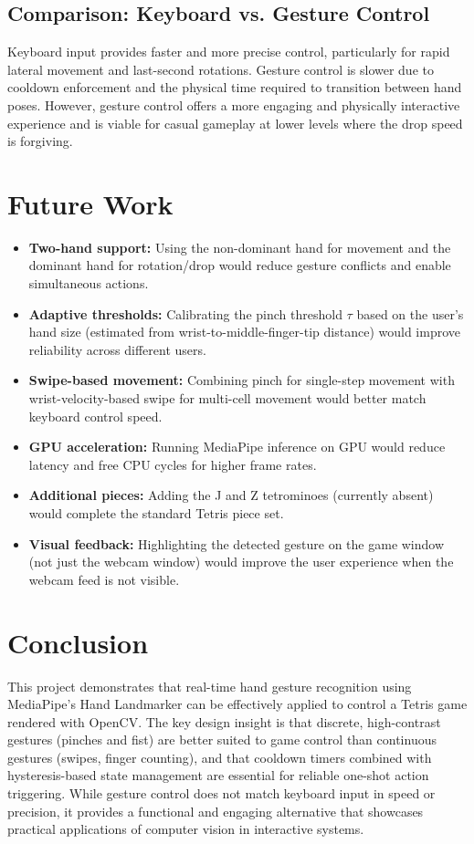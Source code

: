 \documentclass[conference]{IEEEtran}
\begin{document}
\subsection{Comparison: Keyboard vs. Gesture Control}

Keyboard input provides faster and more precise control, particularly for rapid lateral movement and last-second rotations. Gesture control is slower due to cooldown enforcement and the physical time required to transition between hand poses. However, gesture control offers a more engaging and physically interactive experience and is viable for casual gameplay at lower levels where the drop speed is forgiving.

\section{Future Work}

\begin{itemize}
    \item \textbf{Two-hand support:} Using the non-dominant hand for movement and the dominant hand for rotation/drop would reduce gesture conflicts and enable simultaneous actions.
    \item \textbf{Adaptive thresholds:} Calibrating the pinch threshold $\tau$ based on the user's hand size (estimated from wrist-to-middle-finger-tip distance) would improve reliability across different users.
    \item \textbf{Swipe-based movement:} Combining pinch for single-step movement with wrist-velocity-based swipe for multi-cell movement would better match keyboard control speed.
    \item \textbf{GPU acceleration:} Running MediaPipe inference on GPU would reduce latency and free CPU cycles for higher frame rates.
    \item \textbf{Additional pieces:} Adding the J and Z tetrominoes (currently absent) would complete the standard Tetris piece set.
    \item \textbf{Visual feedback:} Highlighting the detected gesture on the game window (not just the webcam window) would improve the user experience when the webcam feed is not visible.
\end{itemize}

\section*{Conclusion}

This project demonstrates that real-time hand gesture recognition using MediaPipe's Hand Landmarker can be effectively applied to control a Tetris game rendered with OpenCV. The key design insight is that discrete, high-contrast gestures (pinches and fist) are better suited to game control than continuous gestures (swipes, finger counting), and that cooldown timers combined with hysteresis-based state management are essential for reliable one-shot action triggering. While gesture control does not match keyboard input in speed or precision, it provides a functional and engaging alternative that showcases practical applications of computer vision in interactive systems.
\end{document}
